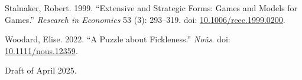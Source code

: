 \documentclass[
  11pt,
  letterpaper,
  DIV=11,
  numbers=noendperiod,
  twoside]{scrartcl}
\newlength{\cslhangindent}
\newenvironment{CSLReferences}[2] %
 {\begin{list}{}{%
  \setlength{\itemindent}{0pt}
  \setlength{\leftmargin}{0pt}
  \setlength{\parsep}{0pt}
  \ifodd #1
   \setlength{\leftmargin}{\cslhangindent}
   \setlength{\itemindent}{-1\cslhangindent}
  \fi
  \setlength{\itemsep}{#2\baselineskip}}}
 {\end{list}}
\begin{document}
\begin{CSLReferences}{1}{0}
Stalnaker, Robert. 1999. {``Extensive and Strategic Forms: Games and
Models for Games.''} \emph{Research in Economics} 53 (3): 293--319. doi:
\href{https://doi.org/10.1006/reec.1999.0200}{10.1006/reec.1999.0200}.

Woodard, Elise. 2022. {``A Puzzle about Fickleness.''} \emph{No{û}s}.
doi: \href{https://doi.org/10.1111/nous.12359}{10.1111/nous.12359}.

\end{CSLReferences}



\noindent Draft of April 2025.
\end{document}
